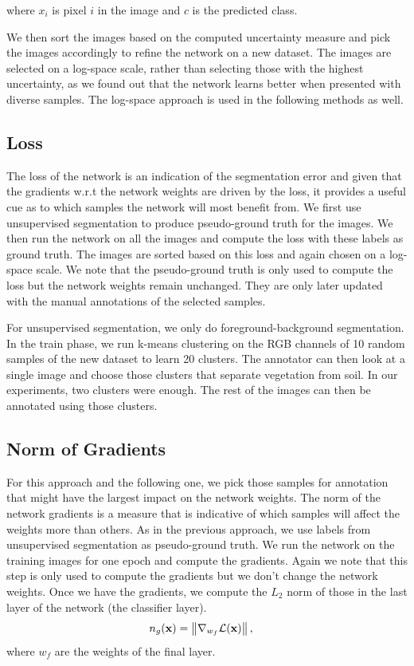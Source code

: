 \documentclass[letterpaper, 10 pt, conference]{ieeeconf}  %
\begin{document}
where $x_i$ is pixel $i$ in the image and $c$ is the predicted class.

We then sort the images based on the computed uncertainty measure and pick the images accordingly to refine the network on a new dataset. The images are selected on a log-space scale, rather than selecting those with the highest uncertainty, as we found out that the network learns better when presented with diverse samples. The log-space approach is used in the following methods as well.

\subsection{Loss} \label{sec:loss}

The loss of the network is an indication of the segmentation error and given that the gradients w.r.t the network weights are driven by the loss, it provides a useful cue as to which samples the network will most benefit from. We first use unsupervised segmentation to produce pseudo-ground truth for the images. We then run the network on all the images and compute the loss with these labels as ground truth. The images are sorted based on this loss and again chosen on a log-space scale. We note that the pseudo-ground truth is only used to compute the loss but the network weights remain unchanged. They are only later updated with the manual annotations of the selected samples.

For unsupervised segmentation, we only do foreground-background segmentation. In the train phase, we run k-means clustering on the RGB channels of 10 random samples of the new dataset to learn 20 clusters. The annotator can then look at a single image and choose those clusters that separate vegetation from soil. In our experiments, two clusters were enough. The rest of the images can then be annotated using those clusters. 


\subsection{Norm of Gradients} \label{sec:grad_norm}

For this approach and the following one, we pick those samples for annotation that might have the largest impact on the network weights. The norm of the network gradients is a measure that is indicative of which samples will affect the weights more than others. As in the previous approach, we use labels from unsupervised segmentation as pseudo-ground truth. We run the network on the training images for one epoch and compute the gradients. Again we note that this step is only used to compute the gradients but we don't change the network weights. Once we have the gradients, we compute the $L_2$ norm of those in the last layer of the network (the classifier layer).
\begin{align}
n_g(\bold{x}) &=  \left\lVert \nabla_{w_f} \mathcal{L}(\bold{x}) \right\rVert,
\end{align}  
where $w_f$ are the weights of the final layer.
\end{document}
